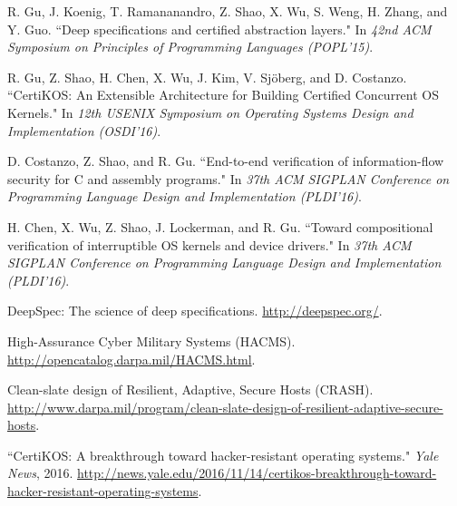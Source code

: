 \documentclass[a4paper, 10pt]{article}
\begin{document}
\begin{footnotesize}
\begin{thebibliography}{}




R. Gu, J. Koenig, T. Ramananandro, Z. Shao, X. Wu, S. Weng, H. Zhang, and Y. Guo. ``Deep specifications and certified abstraction layers." In
\emph{42nd ACM Symposium on Principles of Programming
Languages (POPL'15)}.

R. Gu, Z. Shao, H. Chen, X. Wu, J. Kim, V. Sj\"{o}berg, and D. Costanzo. ``CertiKOS: An Extensible Architecture for Building Certified Concurrent OS Kernels." In \emph{12th USENIX Symposium on Operating Systems Design and Implementation (OSDI'16)}. 

D. Costanzo,  Z. Shao, and R. Gu. ``End-to-end verification of information-flow security for C and assembly programs." In 
\emph{37th ACM SIGPLAN Conference on Programming Language Design and Implementation (PLDI'16)}.

H. Chen,  X. Wu, Z. Shao, J. Lockerman, and R. Gu. ``Toward compositional verification of interruptible OS kernels and device drivers." In \emph{37th ACM SIGPLAN Conference on Programming Language Design and Implementation (PLDI'16)}.





DeepSpec: The science of deep specifications. 
\url{http://deepspec.org/}.

High-Assurance Cyber Military Systems (HACMS). 
\url{http://opencatalog.darpa.mil/HACMS.html}.

Clean-slate design of Resilient, Adaptive, Secure Hosts (CRASH). 
\url{http://www.darpa.mil/program/clean-slate-design-of-resilient-adaptive-secure-hosts}.

``CertiKOS: A breakthrough toward hacker-resistant operating systems." \emph{Yale News}, 2016.
\url{http://news.yale.edu/2016/11/14/certikos-breakthrough-toward-hacker-resistant-operating-systems}.


\end{thebibliography}
\end{footnotesize}
\end{document}
